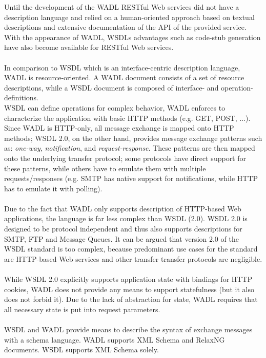 Until the development of the WADL RESTful Web services did not have a description language and relied on a human-oriented approach based on textual descriptions and extensive documentation of the API of the provided service. \cite{PROGRAMWEB} With the appearance of WADL, WSDLs advantages such as code-stub generation have also become available for RESTful Web services.
\\ \\
In comparison to WSDL which is an interface-centric description language, WADL is resource-oriented. A WADL document consists of a set of resource descriptions, while a WSDL document is composed of interface-  and operation-definitions.
\\
WSDL can define operations for complex behavior, WADL enforces to characterize the application with basic HTTP methods (e.g. GET, POST, ...). Since WADL is HTTP-only, all message exchange is mapped onto HTTP methods; WSDL 2.0, on the other hand, provides message exchange patterns such as: \emph{one-way}, \emph{notification}, and \emph{request-response}. These patterns are then mapped onto the underlying transfer protocol; some protocols have direct support for these patterns, while others have to emulate them with multiple requests/responses (e.g. SMTP has native support for notifications, while HTTP has to emulate it with polling).
\\ \\
Due to the fact that WADL only supports description of HTTP-based Web applications, the language is far less complex than WSDL (2.0). WSDL 2.0 is designed to be protocol independent and thus also supports descriptions for SMTP, FTP and Message Queues. It can be argued that version 2.0 of the WSDL standard is too complex, because predominant use cases for the standard are HTTP-based Web services and other transfer transfer protocols are negligible. 
\\ \\
While WSDL 2.0 explicitly supports application state with bindings for HTTP cookies, WADL does not provide any means to support statefulness (but it also does not forbid it). Due to the lack of abstraction for state, WADL requires that all necessary state is put into request parameters. \cite{WADLWSDL}
\\ \\
WSDL and WADL provide means to describe the syntax of exchange messages with a schema language. WADL supports XML Schema and RelaxNG documents. WSDL supports XML Schema solely.